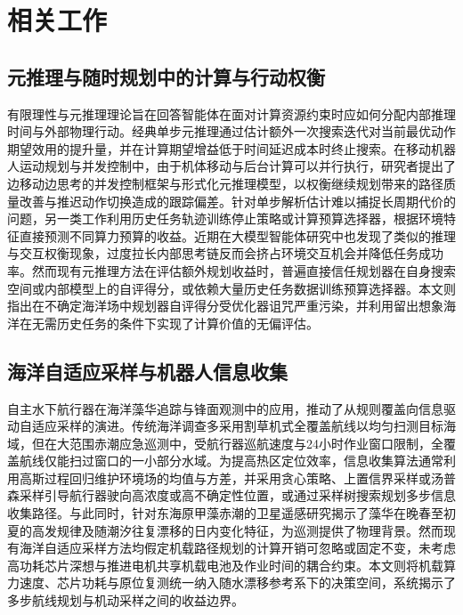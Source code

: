 \section{相关工作}

\subsection{元推理与随时规划中的计算与行动权衡}

有限理性与元推理理论旨在回答智能体在面对计算资源约束时应如何分配内部推理时间与外部物理行动\cite{horvitz1987reasoning, russell1991right}。经典单步元推理通过估计额外一次搜索迭代对当前最优动作期望效用的提升量，并在计算期望增益低于时间延迟成本时终止搜索\cite{lin2015metareasoning}。在移动机器人运动规划与并发控制中，由于机体移动与后台计算可以并行执行，研究者提出了边移动边思考的并发控制框架与形式化元推理模型，以权衡继续规划带来的路径质量改善与推迟动作切换造成的跟踪偏差\cite{xiao2020thinking, elboher2023formal}。针对单步解析估计难以捕捉长周期代价的问题，另一类工作利用历史任务轨迹训练停止策略或计算预算选择器，根据环境特征直接预测不同算力预算的收益\cite{sung2021quit, magnino2026metareasoning}。近期在大模型智能体研究中也发现了类似的推理与交互权衡现象，过度拉长内部思考链反而会挤占环境交互机会并降低任务成功率\cite{shen2025thinking, cuadron2025overthinking, hunt2021formalizing}。然而现有元推理方法在评估额外规划收益时，普遍直接信任规划器在自身搜索空间或内部模型上的自评得分，或依赖大量历史任务数据训练预算选择器。本文则指出在不确定海洋场中规划器自评得分受优化器诅咒严重污染，并利用留出想象海洋在无需历史任务的条件下实现了计算价值的无偏评估。

\subsection{海洋自适应采样与机器人信息收集}

自主水下航行器在海洋藻华追踪与锋面观测中的应用，推动了从规则覆盖向信息驱动自适应采样的演进\cite{fossum2019}。传统海洋调查多采用割草机式全覆盖航线以均匀扫测目标海域\cite{galceran2013coverage}，但在大范围赤潮应急巡测中，受航行器巡航速度与24小时作业窗口限制，全覆盖航线仅能扫过窗口的一小部分水域。为提高热区定位效率，信息收集算法通常利用高斯过程回归维护环境场的均值与方差，并采用贪心策略、上置信界采样\cite{srinivas2012gpucb}或汤普森采样\cite{russo2018thompson}引导航行器驶向高浓度或高不确定性位置，或通过采样树搜索规划多步信息收集路径\cite{hollinger2014sampling}。与此同时，针对东海原甲藻赤潮的卫星遥感研究揭示了藻华在晚春至初夏的高发规律及随潮汐往复漂移的日内变化特征\cite{lou2014diurnal, zhao2025distinguishing}，为巡测提供了物理背景。然而现有海洋自适应采样方法均假定机载路径规划的计算开销可忽略或固定不变，未考虑高功耗芯片深想与推进电机共享机载电池及作业时间的耦合约束。本文则将机载算力速度、芯片功耗与原位复测统一纳入随水漂移参考系下的决策空间，系统揭示了多步航线规划与机动采样之间的收益边界。

